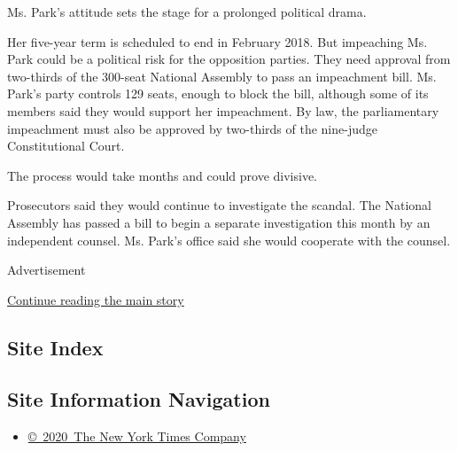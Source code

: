 Ms. Park's attitude sets the stage for a prolonged political drama.

Her five-year term is scheduled to end in February 2018. But impeaching
Ms. Park could be a political risk for the opposition parties. They need
approval from two-thirds of the 300-seat National Assembly to pass an
impeachment bill. Ms. Park's party controls 129 seats, enough to block
the bill, although some of its members said they would support her
impeachment. By law, the parliamentary impeachment must also be approved
by two-thirds of the nine-judge Constitutional Court.

The process would take months and could prove divisive.

Prosecutors said they would continue to investigate the scandal. The
National Assembly has passed a bill to begin a separate investigation
this month by an independent counsel. Ms. Park's office said she would
cooperate with the counsel.

Advertisement

\protect\hyperlink{after-bottom}{Continue reading the main story}

\hypertarget{site-index}{%
\subsection{Site Index}\label{site-index}}

\hypertarget{site-information-navigation}{%
\subsection{Site Information
Navigation}\label{site-information-navigation}}

\begin{itemize}
\tightlist
\item
  \href{https://help.nytimes3xbfgragh.onion/hc/en-us/articles/115014792127-Copyright-notice}{©~2020~The
  New York Times Company}
\end{itemize}

